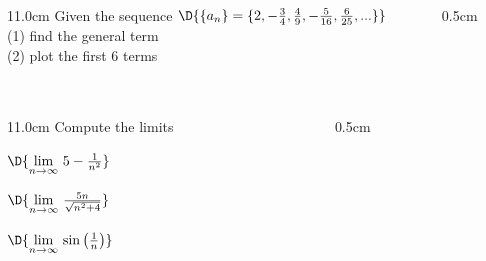 \begin{frame}
\frametitle{}
\scriptsize

\vspace{0.2cm}

\begin{columns}
\begin{column}{11.0cm}
Given the sequence $\D{\{a_n\} = \{ 2, -\frac{3}{4}, \frac{4}{9}, -\frac{5}{16},\frac{6}{25}, ...\}}$\\
\vspace{0.2cm}
(1) find the general term \\
\vspace{0.2cm}
(2) plot the first 6 terms \\ 

\vspace{10.5cm}

\end{column}
\begin{column}{0.5cm}
	
\end{column}
\end{columns}
\end{frame}

\begin{frame}
\frametitle{}
\scriptsize

\vspace{0.2cm}

\begin{columns}
\begin{column}{11.0cm}
Compute the limits

\vspace{0.2cm}

$\D{\lim \limits_{n \to \infty}\, 5 - \frac{1}{n^2}}$

\vspace{2.2cm}

$\D{\lim \limits_{n \to \infty}\, \frac{5n}{\sqrt{n^2+4}}}$

\vspace{2.2cm}

$\D{\lim \limits_{n \to \infty}\, \sin\left(\frac{1}{n}\right)}$

\vspace{3.5cm}

\end{column}
\begin{column}{0.5cm}
	
\end{column}
\end{columns}
\end{frame}

